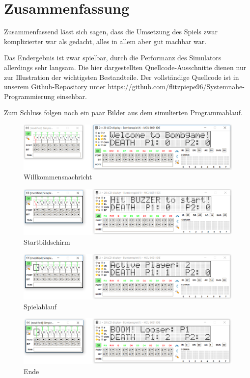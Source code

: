 \chapter{Zusammenfassung}

Zusammenfassend lässt sich sagen, dass die Umsetzung des Spiels zwar komplizierter war als gedacht, alles in allem aber gut machbar war.

Das Endergebnis ist zwar spielbar, durch die Performanz des Simulators allerdings sehr langsam. Die hier dargestellten Quellcode-Ausschnitte dienen nur zur Illustration der wichtigsten Bestandteile. Der vollständige Quellcode ist in unserem Github-Repository unter https://github.com/flitzpiepe96/Systemnahe-Programmierung einsehbar.

Zum Schluss folgen noch ein paar Bilder aus dem simulierten Programmablauf.

\begin{figure}[htbp]
	\centering
	\includegraphics[scale=0.63]{img/Welcome}
	\caption{Willkommensnachricht}
\end{figure}

\begin{figure}[htbp]
	\centering
	\includegraphics[scale=0.63]{img/StartGame}
	\caption{Startbildschirm}
\end{figure}

\begin{figure}[htbp]
	\centering
	\includegraphics[scale=0.63]{img/Game}
	\caption{Spielablauf}
\end{figure}

\begin{figure}[htbp]
	\centering
	\includegraphics[scale=0.63]{img/Looser}
	\caption{Ende}
\end{figure}